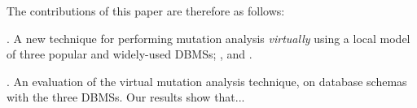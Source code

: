 The contributions of this paper are therefore as follows:

. A new technique for performing mutation analysis {\it virtually} using a local model of three popular and widely-used DBMSs; \HyperSQL, \Postgres and \SQLite.

\vspace{1mm} . An evaluation of the virtual mutation analysis technique, on \numschemas database schemas with the three DBMSs. Our results show that...






